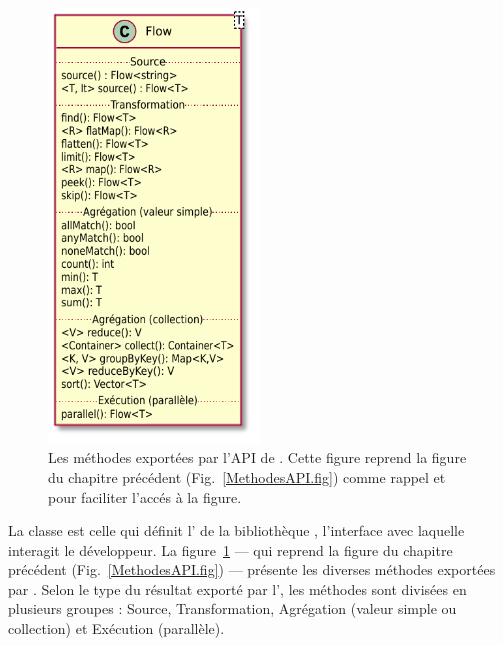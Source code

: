 \begin{figure}
\centering
     \includegraphics[width=0.5\textwidth]{Figures/flow-details.pdf}
      \caption[Les m\'ethodes export\'ees par l'API de .]{Les m\'ethodes export\'ees par l'API de . Cette figure reprend la figure du chapitre pr\'ec\'edent (Fig.~\ref{MethodesAPI.fig}) comme rappel et pour faciliter l'acc\'es \`a la figure.}
       \label{Flow.fig}
\end{figure}



La classe  est celle qui définit l' de la biblioth\`eque , l'interface avec laquelle interagit le d\'eveloppeur. La figure~\ref{Flow.fig} --- qui reprend la figure du chapitre pr\'ec\'edent (Fig.~\ref{MethodesAPI.fig}) --- pr\'esente les diverses m\'ethodes export\'ees par . Selon le type du résultat export\'e par l', les m\'ethodes sont divis\'ees en plusieurs groupes : Source, Transformation, Agr\'egation (valeur simple ou collection) et Ex\'ecution (parallèle).

